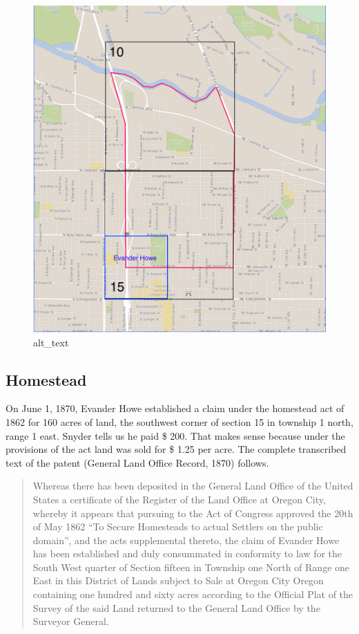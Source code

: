 \documentclass[
  12pt,
]{book}
\begin{document}
\begin{figure}
\centering
\includegraphics{images/0201a_images/image1.png}
\caption{alt\_text}
\end{figure}

\hypertarget{homestead}{%
\subsection{Homestead}\label{homestead}}

On June 1, 1870, Evander Howe established a claim under the homestead act of 1862 for 160 acres of land, the southwest corner of section 15 in township 1 north, range 1 east. Snyder tells us he paid \$ 200. That makes sense because under the provisions of the act land was sold for \$ 1.25 per acre. The complete transcribed text of the patent (General Land Office Record, 1870) follows.

\begin{quote}
Whereas there has been deposited in the General Land Office of the United States a certificate of the Register of the Land Office at Oregon City, whereby it appears that pursuing to the Act of Congress approved the 20th of May 1862 ``To Secure Homesteads to actual Settlers on the public domain'', and the acts supplemental thereto, the claim of Evander Howe has been established and duly consummated in conformity to law for the South West quarter of Section fifteen in Township one North of Range one East in this District of Lands subject to Sale at Oregon City Oregon containing one hundred and sixty acres according to the Official Plat of the Survey of the said Land returned to the General Land Office by the Surveyor General.
\end{quote}
\end{document}
